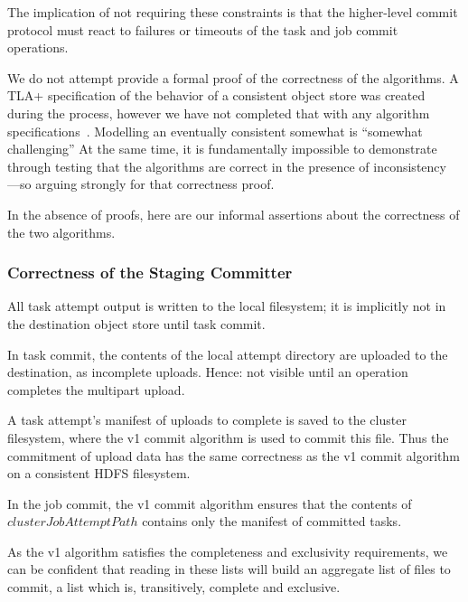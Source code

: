 \documentclass[conference]{IEEEtran}
\begin{document}
The implication of not requiring these constraints is that the higher-level
commit protocol must react to failures or timeouts of the task and job
commit operations.



We do not attempt provide a formal proof of the correctness of the algorithms.
A TLA+ specification of the behavior of a consistent object store was created
during the process, however we have not completed that with any
algorithm specifications\ \cite{s3-tla}.
Modelling an eventually consistent somewhat is ``somewhat challenging''
At the same time, it is fundamentally impossible to demonstrate through testing
that the algorithms are correct in the presence of inconsistency ---so arguing
strongly for that correctness proof.

In the absence of proofs,
here are our informal assertions about the correctness of the two algorithms.

\subsubsection{Correctness of the Staging Committer}

All task attempt output is written to the local filesystem;
it is implicitly not in the destination object store until task commit.

In task commit, the contents of the local attempt directory are uploaded to the
destination, as incomplete uploads.
Hence: not visible until an operation completes the multipart upload.

A task attempt's manifest of uploads to complete is saved to the cluster filesystem,
where the v1 commit algorithm is used to commit this file.
Thus the commitment of upload data has the same correctness as the
v1 commit algorithm on a consistent HDFS filesystem.

In the job commit, the v1 commit algorithm ensures that the contents
of $clusterJobAttemptPath$ contains only the manifest of committed tasks.

As the v1 algorithm satisfies the completeness and exclusivity requirements,
we can be confident that reading in these lists will build an aggregate list
of files to commit, a list which is, transitively, complete and exclusive.
\end{document}
